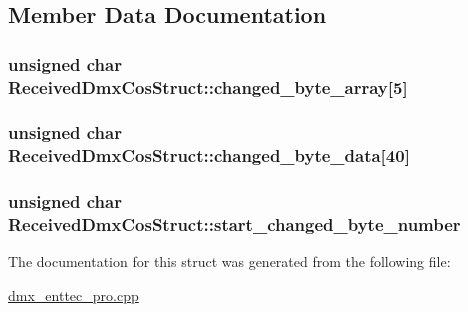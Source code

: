 \subsection{Member Data Documentation}
\hypertarget{struct_received_dmx_cos_struct_a863941290eeb0f634dd83aa8a2389718}{
\subsubsection[{changed\-\_\-byte\-\_\-array}]{\setlength{\rightskip}{0pt plus 5cm}unsigned char Received\-Dmx\-Cos\-Struct\-::changed\-\_\-byte\-\_\-array\mbox{[}5\mbox{]}}}\label{struct_received_dmx_cos_struct_a863941290eeb0f634dd83aa8a2389718}
\hypertarget{struct_received_dmx_cos_struct_aa3984590d4af300c37c465375dd7ba0f}{
\subsubsection[{changed\-\_\-byte\-\_\-data}]{\setlength{\rightskip}{0pt plus 5cm}unsigned char Received\-Dmx\-Cos\-Struct\-::changed\-\_\-byte\-\_\-data\mbox{[}40\mbox{]}}}\label{struct_received_dmx_cos_struct_aa3984590d4af300c37c465375dd7ba0f}
\hypertarget{struct_received_dmx_cos_struct_a4cf39b60236997522f11155b63b2f090}{
\subsubsection[{start\-\_\-changed\-\_\-byte\-\_\-number}]{\setlength{\rightskip}{0pt plus 5cm}unsigned char Received\-Dmx\-Cos\-Struct\-::start\-\_\-changed\-\_\-byte\-\_\-number}}\label{struct_received_dmx_cos_struct_a4cf39b60236997522f11155b63b2f090}


The documentation for this struct was generated from the following file\-:\begin{DoxyCompactItemize}
\item 
\hyperlink{dmx__enttec__pro_8cpp}{dmx\-\_\-enttec\-\_\-pro.\-cpp}\end{DoxyCompactItemize}
